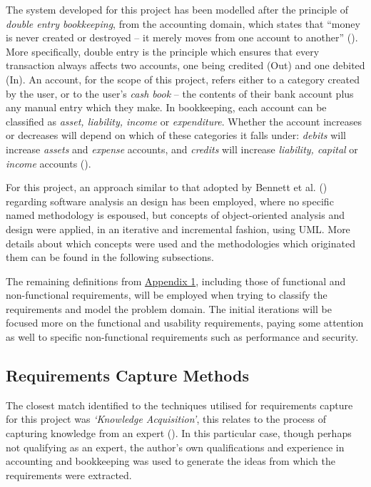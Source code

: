 The system developed for this project has been modelled after the principle of
\emph{double entry bookkeeping}, from the accounting domain, which states that
``money is never created or destroyed -- it merely moves from one account to
another'' (\cite[][Section 6.2]{fowler1997analysis}). More specifically, double
entry is the principle which ensures that every transaction always affects two
accounts, one being credited (Out) and one debited (In). An account, for the
scope of this project, refers either to a category created by the user, or to
the user's \emph{cash book} -- the contents of their bank account plus any
manual entry which they make. In bookkeeping, each account can be classified as
\emph{asset, liability, income} or \emph{expenditure}. Whether the account
increases or decreases will depend on which of these categories it falls under:
\emph{debits} will increase \emph{assets} and \emph{expense} accounts, and
\emph{credits} will increase \emph{liability, capital} or \emph{income}
accounts (\cite[][pp.~18-19]{wood2004book}).


For this project, an approach similar to that adopted by Bennett et al.
(\citeyear[][p.~77]{bennett2010object}) regarding software analysis an design
has been employed, where no specific named methodology is espoused, but
concepts of object-oriented analysis and design were applied, in an iterative
and incremental fashion, using UML. More details about which concepts were used
and the methodologies which originated them can be found in the following
subsections.


The remaining definitions from \hyperref[appendix1]{Appendix 1}, including
those of functional and non-functional requirements, will be employed when
trying to classify the requirements and model the problem domain. The initial
iterations will be focused more on the functional and usability requirements,
paying some attention as well to specific non-functional requirements such as
performance and security.


\subsection{Requirements Capture Methods} \label{sec:DevelopmentMethod.RequirementsCapture}
The closest match identified to the techniques utilised for requirements
capture for this project was \emph{`Knowledge Acquisition'}, this relates to
the process of capturing knowledge from an expert
(\cite[][p.~150]{bennett2010object}). In this particular case, though perhaps
not qualifying as an expert, the author's own qualifications and experience in
accounting and bookkeeping was used to generate the ideas from which the
requirements were extracted.

